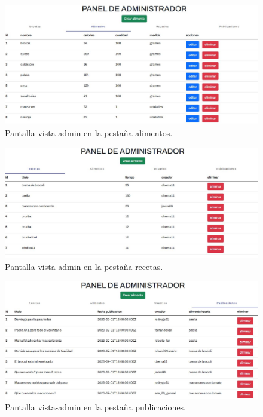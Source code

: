 \begin{figure}
  \centering
  \includegraphics[scale=0.30]{img/ma-alimentos-admin.JPG}
  \caption{Pantalla vista-admin en la pestaña alimentos.}
  \label{fig:ma-alimentos-admin}
\end{figure}

\begin{figure}
  \centering
  \includegraphics[scale=0.30]{img/ma-recetas-admin.JPG}
  \caption{Pantalla vista-admin en la pestaña recetas.}
  \label{fig:ma-recetas-admin}
\end{figure}

\begin{figure}
  \centering
  \includegraphics[scale=0.30]{img/ma-publicaciones-admin.JPG}
  \caption{Pantalla vista-admin en la pestaña publicaciones.}
  \label{fig:ma-publicaciones-admin}
\end{figure}




